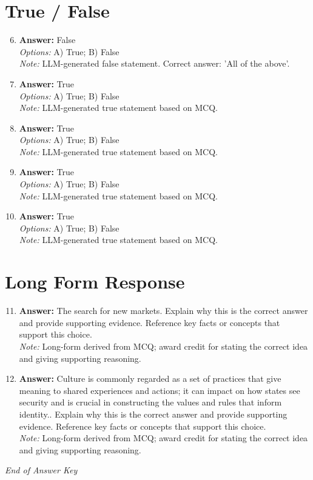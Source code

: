 \documentclass[12pt]{article}
\begin{document}
\section*{True / False}
\begin{enumerate}[label=\arabic*.]
\setcounter{enumi}{5}
\item \textbf{Answer:} False
\\ \textit{Options:} A) True; B) False
\\ \textit{Note:} LLM-generated false statement. Correct answer: 'All of the above'.
\item \textbf{Answer:} True
\\ \textit{Options:} A) True; B) False
\\ \textit{Note:} LLM-generated true statement based on MCQ.
\item \textbf{Answer:} True
\\ \textit{Options:} A) True; B) False
\\ \textit{Note:} LLM-generated true statement based on MCQ.
\item \textbf{Answer:} True
\\ \textit{Options:} A) True; B) False
\\ \textit{Note:} LLM-generated true statement based on MCQ.
\item \textbf{Answer:} True
\\ \textit{Options:} A) True; B) False
\\ \textit{Note:} LLM-generated true statement based on MCQ.
\end{enumerate}

\section*{Long Form Response}
\begin{enumerate}[label=\arabic*.]
\setcounter{enumi}{10}
\item \textbf{Answer:} The search for new markets. Explain why this is the correct answer and provide supporting evidence. Reference key facts or concepts that support this choice.
\\ \textit{Note:} Long-form derived from MCQ; award credit for stating the correct idea and giving supporting reasoning.
\item \textbf{Answer:} Culture is commonly regarded as a set of practices that give meaning to shared experiences and actions; it can impact on how states see security and is crucial in constructing the values and rules that inform identity.. Explain why this is the correct answer and provide supporting evidence. Reference key facts or concepts that support this choice.
\\ \textit{Note:} Long-form derived from MCQ; award credit for stating the correct idea and giving supporting reasoning.
\end{enumerate}

\vfill
\noindent\textit{End of Answer Key}
\end{document}
